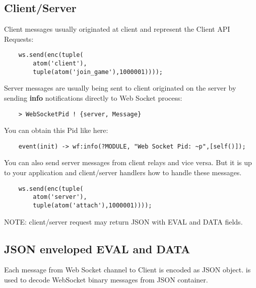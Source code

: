\subsection{Client/Server}

Client messages usually originated at client and represent the Client API Requests:

\vspace{1\baselineskip}
\begin{lstlisting}
    ws.send(enc(tuple(
        atom('client'),
        tuple(atom('join_game'),1000001))));
\end{lstlisting}
\vspace{1\baselineskip}

Server messages are usually being sent to client originated on the
server by sending {\bf info} notifications directly to Web Socket process:

\vspace{1\baselineskip}
\begin{lstlisting}
    > WebSocketPid ! {server, Message}
\end{lstlisting}
\vspace{1\baselineskip}

You can obtain this Pid like here:

\vspace{1\baselineskip}
\begin{lstlisting}
    event(init) -> wf:info(?MODULE, "Web Socket Pid: ~p",[self()]);
\end{lstlisting}
\vspace{1\baselineskip}

You can also send server messages from client relays and vice versa.
But it is up to your application and client/server handlers how to handle these messages.

\vspace{1\baselineskip}
\begin{lstlisting}
    ws.send(enc(tuple(
        atom('server'),
        tuple(atom('attach'),1000001))));
\end{lstlisting}
\vspace{1\baselineskip}

NOTE: client/server request may return JSON with EVAL and DATA fields.

\subsection*{JSON enveloped EVAL and DATA}

Each message from Web Socket channel to Client is encoded as JSON object.
is used to decode WebSocket binary messages from JSON container.

